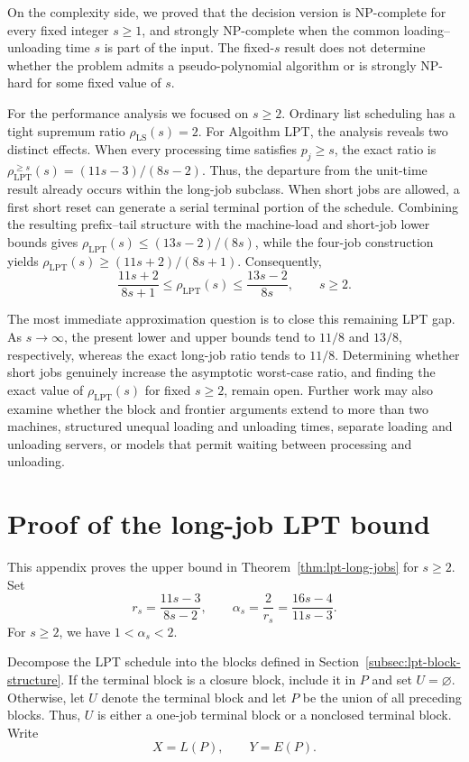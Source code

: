 \documentclass[11pt]{article}
\begin{document}
On the complexity side, we proved that the decision version is NP-complete for
every fixed integer \(s\ge1\), and strongly NP-complete when the common
loading--unloading time \(s\) is part of the input. The fixed-\(s\) result does not
determine whether the problem admits a pseudo-polynomial algorithm or is strongly
NP-hard for some fixed value of \(s\).

For the performance analysis we focused on \(s\ge2\). Ordinary list scheduling has a 
tight supremum ratio \(\rho_{\mathrm{LS}}(s)=2\). For Algoithm LPT, the analysis reveals two
distinct effects. When every processing time satisfies \(p_j\ge s\), the exact ratio is
\(\rho_{\mathrm{LPT}}^{\ge s}(s)=(11s-3)/(8s-2)\).
Thus, the departure from the unit-time result already occurs within the long-job
subclass. When short jobs are allowed, a first short reset can generate a serial
terminal portion of the schedule. Combining the resulting prefix--tail structure with
the machine-load and short-job lower bounds gives
\(\rho_{\mathrm{LPT}}(s)\le(13s-2)/(8s)\), while the four-job construction yields
\(\rho_{\mathrm{LPT}}(s)\ge(11s+2)/(8s+1)\). Consequently,
\[
\frac{11s+2}{8s+1}
\le
\rho_{\mathrm{LPT}}(s)
\le
\frac{13s-2}{8s},
\qquad s\ge2.
\]

The most immediate approximation question is to close this remaining LPT gap. As
\(s\to\infty\), the present lower and upper bounds tend to \(11/8\) and \(13/8\),
respectively, whereas the exact long-job ratio tends to \(11/8\). Determining
whether short jobs genuinely increase the asymptotic worst-case ratio, and finding
the exact value of \(\rho_{\mathrm{LPT}}(s)\) for fixed \(s\ge2\), remain open.
Further work may also examine whether the block and frontier arguments extend to
more than two machines, structured unequal loading and unloading times, separate
loading and unloading servers, or models that permit waiting between processing
and unloading.

\appendix

\section{Proof of the long-job LPT bound}
\label{app:lpt-long-proof}

This appendix proves the upper bound in
Theorem~\ref{thm:lpt-long-jobs} for \(s\ge2\). Set
\[
r_s=\frac{11s-3}{8s-2},
\qquad
\alpha_s=\frac{2}{r_s}=\frac{16s-4}{11s-3}.
\tag{A.1}
\label{eq:lpt-alpha}
\]
For \(s\ge2\), we have \(1<\alpha_s<2\).

Decompose the LPT schedule into the blocks defined in
Section~\ref{subsec:lpt-block-structure}. If the terminal block is a closure
block, include it in \(P\) and set \(U=\varnothing\). Otherwise, let \(U\)
denote the terminal block and let \(P\) be the union of all preceding blocks.
Thus, \(U\) is either a one-job terminal block or a nonclosed terminal block.
Write
\[
X=L(P),
\qquad
Y=E(P).
\]
\end{document}
